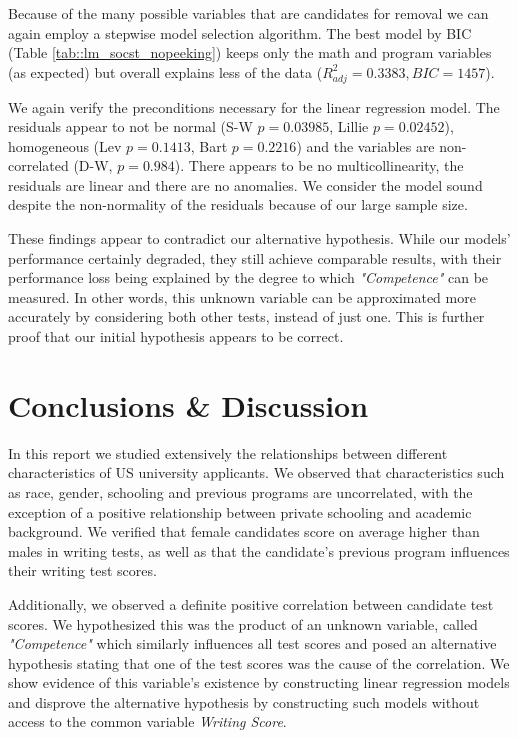 \documentclass[10pt, a4paper]{article}
\begin{document}
	Because of the many possible variables that are candidates for removal we can again employ a stepwise model selection algorithm. The best model by BIC (Table \ref{tab::lm_socst_nopeeking}) keeps only the math and program variables (as expected) but overall explains less of the data ($R^2_{adj} = 0.3383, BIC=1457$).
	
	We again verify the preconditions necessary for the linear regression model. The residuals appear to not be normal (S-W $p = 0.03985$, Lillie $p=0.02452$), homogeneous (Lev $p = 0.1413$, Bart $p = 0.2216$) and the variables are non-correlated (D-W, $p=0.984$). There appears to be no multicollinearity, the residuals are linear and there are no anomalies. We consider the model sound  despite the non-normality of the residuals because of our large sample size.
	
	These findings appear to contradict our alternative hypothesis. While our models' performance certainly degraded, they still achieve comparable results, with their performance loss being explained by the degree to which \textit{"Competence"} can be measured. In other words, this unknown variable can be approximated more accurately by considering both other tests, instead of just one. This is further proof that our initial hypothesis appears to be correct.

	\section{Conclusions \& Discussion}
	\label{sec::conclusions}
	
	In this report we studied extensively the relationships between different characteristics of US university applicants. We observed that characteristics such as race, gender, schooling and previous programs are uncorrelated, with the exception of a positive relationship between private schooling and academic background. We verified that female candidates score on average higher than males in writing tests, as well as that the candidate's previous program influences their writing test scores. 
	
	Additionally, we observed a definite positive correlation between candidate test scores. We hypothesized this was the product of an unknown variable, called \textit{"Competence"} which similarly influences all test scores and posed an alternative hypothesis stating that one of the test scores was the cause of the correlation. We show evidence of this variable's existence by constructing linear regression models and disprove the alternative hypothesis by constructing such models without access to the common variable \textit{Writing Score}.
	
\end{document}
